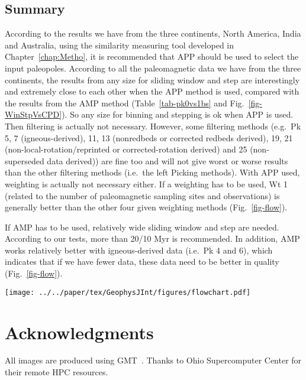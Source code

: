 \subsection{Summary}

According to the results we have from the three continents, North America, India
and Australia, using the similarity measuring tool developed in Chapter~\ref{chap:Metho}, it is
recommended that APP should be used to select the input paleopoles. According to
all the paleomagnetic data we have from the three continents, the results from
any size for sliding window and step are interestingly and extremely close to
each other when the APP method is used, compared with the results from the AMP
method (Table~\ref{tab-pk0vs1bs} and Fig.~\ref{fig-WinStpVsCPD}). So any size
for binning and stepping is ok when APP is used. Then filtering is actually not
necessary. However, some filtering methods (e.g.\ Pk 5, 7 (igneous-derived), 11,
13 (nonredbeds or corrected redbeds derived), 19, 21
(non-local-rotation/reprinted or corrected-rotation derived) and 25
(non-superseded data derived)) are fine too and will not give worst or worse
results than the other filtering methods (i.e.\ the left Picking methods). With
APP used, weighting is actually not necessary either. If a weighting has to be
used, Wt 1 (related to the number of paleomagnetic sampling sites and
observations) is generally better than the other four given weighting methods
(Fig.~\ref{fig-flow}).

If AMP has to be used, relatively wide sliding window and step are needed.
According to our tests, more than 20/10 Myr is recommended. In addition, AMP
works relatively better with igneous-derived data (i.e.\ Pk 4 and 6),
which indicates that if we have fewer data, these data need to be better in
quality (Fig.~\ref{fig-flow}).

\begin{figure*}
\centering
\texttt{[image: ../../paper/tex/GeophysJInt/figures/flowchart.pdf]}
\caption[Flowchart]{Flowchart for recommended procedure of processing
  paleomagnetic data.}\label{fig-flow}
\end{figure*}

\section*{Acknowledgments}
All images are produced using GMT~\citep{W13}. Thanks to Ohio Supercomputer
Center for their remote HPC resources.
